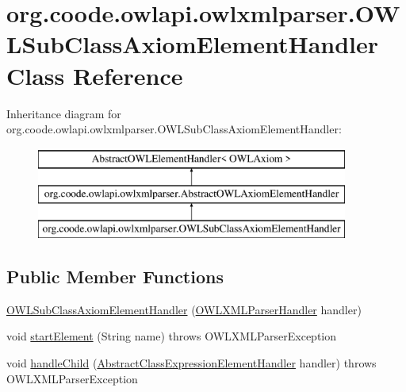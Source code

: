 \hypertarget{classorg_1_1coode_1_1owlapi_1_1owlxmlparser_1_1_o_w_l_sub_class_axiom_element_handler}{\section{org.\-coode.\-owlapi.\-owlxmlparser.\-O\-W\-L\-Sub\-Class\-Axiom\-Element\-Handler Class Reference}
\label{classorg_1_1coode_1_1owlapi_1_1owlxmlparser_1_1_o_w_l_sub_class_axiom_element_handler}
}
Inheritance diagram for org.\-coode.\-owlapi.\-owlxmlparser.\-O\-W\-L\-Sub\-Class\-Axiom\-Element\-Handler\-:\begin{figure}[H]
\begin{center}
\leavevmode
\includegraphics[height=3.000000cm]{classorg_1_1coode_1_1owlapi_1_1owlxmlparser_1_1_o_w_l_sub_class_axiom_element_handler}
\end{center}
\end{figure}
\subsection*{Public Member Functions}
\begin{DoxyCompactItemize}
\item 
\hyperlink{classorg_1_1coode_1_1owlapi_1_1owlxmlparser_1_1_o_w_l_sub_class_axiom_element_handler_a6a0f81806d8779695299331916e388c1}{O\-W\-L\-Sub\-Class\-Axiom\-Element\-Handler} (\hyperlink{classorg_1_1coode_1_1owlapi_1_1owlxmlparser_1_1_o_w_l_x_m_l_parser_handler}{O\-W\-L\-X\-M\-L\-Parser\-Handler} handler)
\item 
void \hyperlink{classorg_1_1coode_1_1owlapi_1_1owlxmlparser_1_1_o_w_l_sub_class_axiom_element_handler_a8e2328f46bccb7e418216e0eb312a2e8}{start\-Element} (String name)  throws O\-W\-L\-X\-M\-L\-Parser\-Exception 
\item 
void \hyperlink{classorg_1_1coode_1_1owlapi_1_1owlxmlparser_1_1_o_w_l_sub_class_axiom_element_handler_a581cd4ae3cae273ede46ccc44ed988b8}{handle\-Child} (\hyperlink{classorg_1_1coode_1_1owlapi_1_1owlxmlparser_1_1_abstract_class_expression_element_handler}{Abstract\-Class\-Expression\-Element\-Handler} handler)  throws O\-W\-L\-X\-M\-L\-Parser\-Exception 
\end{DoxyCompactItemize}
